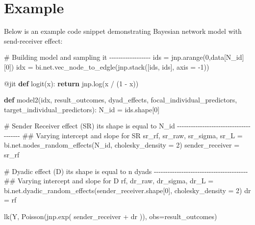 \documentclass[
  letterpaper,
  DIV=11,
  numbers=noendperiod]{scrreprt}
\newenvironment{Shaded}{\begin{snugshade}}{\end{snugshade}}
\newcommand{\AttributeTok}[1]{\textcolor[rgb]{0.40,0.45,0.13}{#1}}
\newcommand{\CommentTok}[1]{\textcolor[rgb]{0.37,0.37,0.37}{#1}}
\newcommand{\ControlFlowTok}[1]{\textcolor[rgb]{0.00,0.23,0.31}{\textbf{#1}}}
\newcommand{\DecValTok}[1]{\textcolor[rgb]{0.68,0.00,0.00}{#1}}
\newcommand{\KeywordTok}[1]{\textcolor[rgb]{0.00,0.23,0.31}{\textbf{#1}}}
\newcommand{\NormalTok}[1]{\textcolor[rgb]{0.00,0.23,0.31}{#1}}
\newcommand{\OperatorTok}[1]{\textcolor[rgb]{0.37,0.37,0.37}{#1}}
\newcommand{\StringTok}[1]{\textcolor[rgb]{0.13,0.47,0.30}{#1}}
\begin{document}
\section{Example}\label{example-17}

Below is an example code snippet demonstrating Bayesian network model
with send-receiver effect:

\begin{Shaded}
\begin{Highlighting}[]
\CommentTok{\# Building model and sampling it {-}{-}{-}{-}{-}{-}{-}{-}{-}{-}{-}{-}{-}{-}{-}{-}{-}{-}}
\NormalTok{ids }\OperatorTok{=}\NormalTok{ jnp.arange(}\DecValTok{0}\NormalTok{,data[}\StringTok{\textquotesingle{}N\_id\textquotesingle{}}\NormalTok{][}\DecValTok{0}\NormalTok{])}
\NormalTok{idx }\OperatorTok{=}\NormalTok{ bi.net.vec\_node\_to\_edgle(jnp.stack([ids, ids], axis }\OperatorTok{=} \OperatorTok{{-}}\DecValTok{1}\NormalTok{))}

\AttributeTok{@jit}
\KeywordTok{def}\NormalTok{ logit(x):}
    \ControlFlowTok{return}\NormalTok{ jnp.log(x }\OperatorTok{/}\NormalTok{ (}\DecValTok{1} \OperatorTok{{-}}\NormalTok{ x))}

\KeywordTok{def}\NormalTok{ model2(idx, result\_outcomes, dyad\_effects, focal\_individual\_predictors, target\_individual\_predictors):}
\NormalTok{    N\_id }\OperatorTok{=}\NormalTok{ ids.shape[}\DecValTok{0}\NormalTok{]}

    \CommentTok{\# Sender Receiver effect (SR) its shape is equal to N\_id {-}{-}{-}{-}{-}{-}{-}{-}{-}{-}{-}{-}{-}{-}{-}{-}{-}{-}{-}{-}{-}{-}{-}{-}{-}{-}{-}{-}{-}{-}{-}{-}{-}{-}{-}{-}{-}{-}{-}}
    \CommentTok{\#\# Varying intercept and slope for SR}
\NormalTok{    sr\_rf, sr\_raw, sr\_sigma, sr\_L }\OperatorTok{=}\NormalTok{ bi.net.nodes\_random\_effects(N\_id, cholesky\_density }\OperatorTok{=} \DecValTok{2}\NormalTok{) }
\NormalTok{    sender\_receiver }\OperatorTok{=}\NormalTok{ sr\_rf}

    \CommentTok{\# Dyadic effect (D) its shape is equal to n dyads {-}{-}{-}{-}{-}{-}{-}{-}{-}{-}{-}{-}{-}{-}{-}{-}{-}{-}{-}{-}{-}{-}{-}{-}{-}{-}{-}{-}{-}{-}{-}{-}{-}{-}{-}{-}{-}{-}{-}{-}{-}}
    \CommentTok{\#\# Varying intercept and slope for D}
\NormalTok{    rf, dr\_raw, dr\_sigma, dr\_L }\OperatorTok{=}\NormalTok{ bi.net.dyadic\_random\_effects(sender\_receiver.shape[}\DecValTok{0}\NormalTok{], cholesky\_density }\OperatorTok{=} \DecValTok{2}\NormalTok{)}
\NormalTok{    dr }\OperatorTok{=}\NormalTok{  rf}

\NormalTok{    lk(}\StringTok{\textquotesingle{}Y\textquotesingle{}}\NormalTok{, Poisson(jnp.exp( sender\_receiver }\OperatorTok{+}\NormalTok{ dr )), obs}\OperatorTok{=}\NormalTok{result\_outcomes)}


\end{Highlighting}
\end{Shaded}
\end{document}
